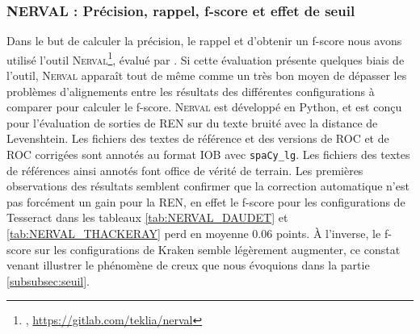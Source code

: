 


\subsubsection{\textsc{NERVAL} : Précision, rappel, f-score et effet de seuil}
\label{subsec:NERVAL_COR-OCR-IMPACT-NER}
Dans le but de calculer la précision, le rappel et d'obtenir un f-score nous avons utilisé l'outil \textsc{Nerval}\footnote{\cite{nerval2021}, \url{https://gitlab.com/teklia/nerval}}, évalué par \cite{koudoro2022reconnaissance}. Si cette évaluation présente quelques biais de l'outil, \textsc{Nerval} apparaît tout de même comme un très bon moyen de dépasser les problèmes d'alignements entre les résultats des différentes configurations à comparer pour calculer le f-score. \textsc{Nerval} est développé en Python, et est conçu pour l'évaluation de sorties de REN sur du texte bruité avec la distance de Levenshtein. Les fichiers des textes de référence et des versions de ROC et de ROC corrigées sont annotés au format IOB avec \texttt{spaCy\_lg}. Les fichiers des textes de références ainsi annotés font office de vérité de terrain.
Les premières observations des résultats semblent confirmer que la correction automatique n'est pas forcément un gain pour la REN, en effet le f-score pour les configurations de Tesseract dans les tableaux \ref{tab:NERVAL_DAUDET} et \ref{tab:NERVAL_THACKERAY} perd en moyenne 0.06 points. À l'inverse, le f-score sur les configurations de Kraken semble légèrement augmenter, ce constat venant illustrer le phénomène de creux que nous évoquions dans la partie \ref{subsubsec:seuil}.

